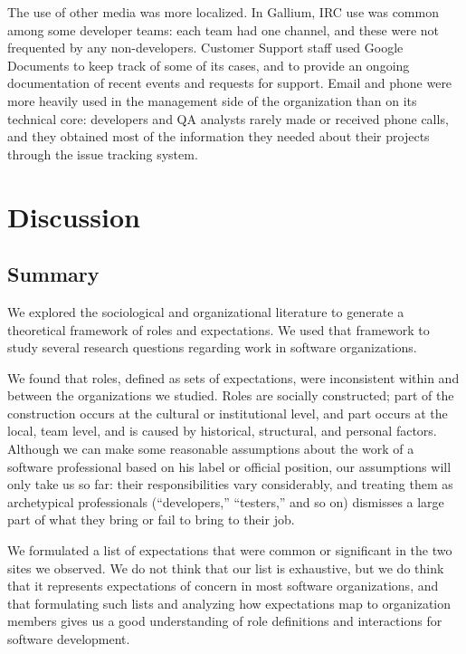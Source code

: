 \documentclass[10pt, conference, compsocconf]{IEEEtran}
\begin{document}
The use of other media was more localized. In Gallium, IRC use was common among some developer teams: each team had one channel, and these were not frequented by any non-developers. Customer Support staff used Google Documents to keep track of some of its cases, and to provide an ongoing documentation of recent events and requests for support. Email and phone were more heavily used in the management side of the organization than on its technical core: developers and QA analysts rarely made or received phone calls, and they obtained most of the information they needed about their projects through the issue tracking system.




\section{Discussion}

\subsection{Summary}

We explored the sociological and organizational literature to generate a theoretical framework of roles and expectations. We used that framework to study several research questions regarding work in software organizations.

We found that roles, defined as sets of expectations, were inconsistent within and between the organizations we studied. Roles are socially constructed; part of the construction occurs at the cultural or institutional level, and part occurs at the local, team level, and is caused by historical, structural, and personal factors. Although we can make some reasonable assumptions about the work of a software professional based on his label or official position, our assumptions will only take us so far: their responsibilities vary considerably, and treating them as archetypical professionals (``developers,'' ``testers,'' and so on) dismisses a large part of what they bring or fail to bring to their job.

We formulated a list of expectations that were common or significant in the two sites we observed. We do not think that our list is exhaustive, but we do think that it represents expectations of concern in most software organizations, and that formulating such lists and analyzing how expectations map to organization members gives us a good understanding of role definitions and interactions for software development.
\end{document}
